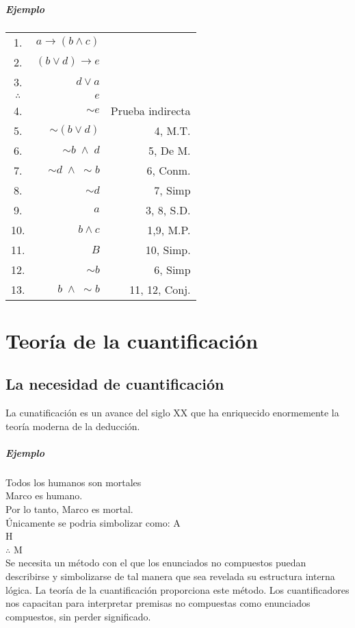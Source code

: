 \documentclass[10pt]{book} 						%
\begin{document}
\paragraph{Ejemplo}
\begin{center}
\begin{tabular}{c r r}
1.&$a \rightarrow (b\land c)$&\\
2.&$(b \lor d)\rightarrow e$&\\
3.&$d \lor a$&\\
$\therefore$&$e$&\\
4.&$\sim e$&Prueba indirecta\\
5.&$\sim(b \lor d)$&4, M.T.\\
6.&$\sim b \; \land \; d$&5, De M.\\
7.&$\sim d \; \land \; \sim b$&6, Conm.\\
8.&$\sim d$&7, Simp\\
9.&$a$&3, 8, S.D.\\
10.&$b \land c $&1,9, M.P.\\
11.&$B$&10, Simp.\\
12.&$\sim b$&6, Simp\\
13.&$b \; \land \; \sim b $&11, 12, Conj.\\
\end{tabular}
\end{center}

\chapter{Teoría de la cuantificación}
\section{La necesidad de cuantificación}
La cunatificación es un avance del siglo XX que ha enriquecido enormemente la teoría moderna de la deducción.\\
\paragraph{Ejemplo}
Todos los humanos son mortales\\
Marco es humano.\\
Por lo tanto, Marco es mortal.\\
Únicamente se podria simbolizar como: 
A\\
H\\
$\therefore$ M\\
Se necesita un método con el que los enunciados no compuestos puedan describirse y simbolizarse de tal manera que sea revelada su estructura interna lógica. La teoría de la cuantificación proporciona este método. Los cuantificadores nos capacitan para interpretar premisas no compuestas como enunciados compuestos, sin perder significado.
\end{document}
